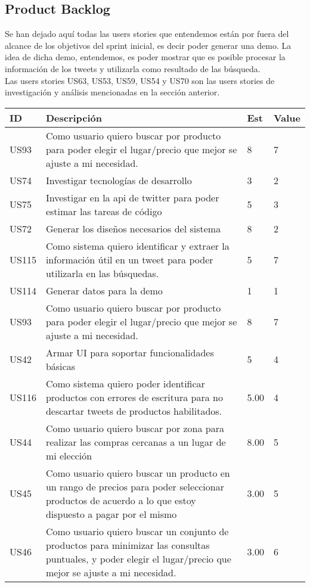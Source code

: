 \documentclass[a4paper,8pt]{article}
\begin{document}
\subsection{Product Backlog}
Se han dejado aquí todas las users stories que entendemos están por fuera del alcance de los objetivos del sprint inicial, es decir poder generar una demo. La idea de dicha demo, entendemos, es poder mostrar que es posible procesar la información de los tweets y utilizarla como resultado de las búsqueda. \\
Las users stories US63, US53, US59, US54 y US70 son las users stories de investigación y análisis mencionadas en la sección anterior.\\
\newpage


\begin{tabular}{|p{1cm}|p{10cm}|p{1cm}|p{1cm}|}
\hline
\hline
\textbf{ID}&\textbf{Descripción}&\textbf{Est}&\textbf{Value}\\
\hline
US93&Como usuario quiero buscar por producto para poder elegir el lugar/precio que mejor se ajuste a mi necesidad.& 8& 7\\
\hline
US74&Investigar tecnologías de desarrollo&3&2\\
\hline
US75&Investigar en la api de twitter para poder estimar las tareas de código&5&3\\
\hline
US72&Generar los diseños necesarios del sistema&8&2\\
\hline
US115&Como sistema quiero identificar y extraer la información útil en un tweet para poder utilizarla en las búsquedas.&5&7\\
\hline
US114&Generar datos para la demo&1&1\\
\hline
US93&Como usuario quiero buscar por producto para poder elegir el lugar/precio que mejor se ajuste a mi necesidad.& 8& 7\\
\hline
US42&Armar UI para soportar funcionalidades básicas& 5& 4\\
\hline
US116& Como sistema quiero poder identificar productos con errores de escritura para no descartar tweets de productos habilitados. &5.00&4\\ 
\hline
US44 &Como usuario quiero buscar por zona para realizar las compras cercanas a un lugar de mi elección &8.00&5\\ 
\hline	
US45 &Como usuario quiero buscar un producto en un rango de precios para poder seleccionar productos de acuerdo a lo que estoy dispuesto a pagar por el mismo &3.00&5\\ 
\hline	
US46 &Como usuario quiero buscar un conjunto de productos para minimizar las consultas puntuales, y poder elegir el lugar/precio que mejor se ajuste a mi necesidad. &3.00&6\\ 

\end{tabular}
\end{document}

